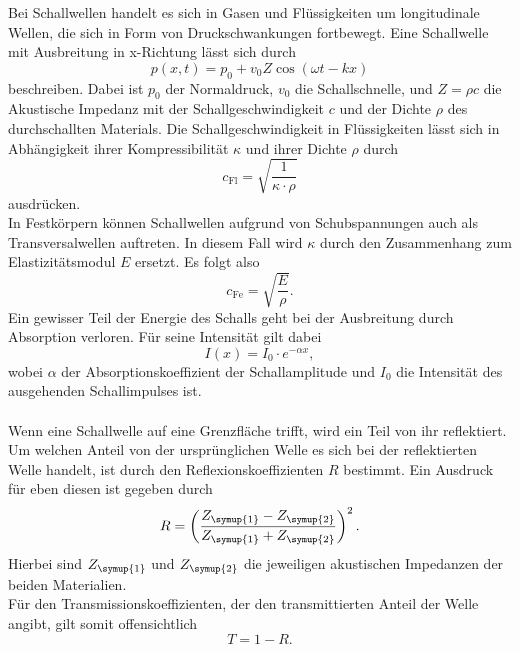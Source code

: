 \label{sec:Schallwellen}
Bei Schallwellen handelt es sich in Gasen und Flüssigkeiten um longitudinale Wellen, die sich in Form von Druckschwankungen fortbewegt.
Eine Schallwelle mit Ausbreitung in x-Richtung lässt sich durch
\begin{equation}
    p(x, t) = p_0 + v_0 Z \cos{(\omega t - kx)}
\end{equation}
beschreiben. Dabei ist $p_0$ der Normaldruck, $v_0$ die Schallschnelle, und $Z=\rho c$ die Akustische
Impedanz mit der Schallgeschwindigkeit $c$ und der Dichte $\rho$ des durchschallten Materials.
Die Schallgeschwindigkeit in Flüssigkeiten lässt sich in Abhängigkeit ihrer Kompressibilität $\kappa$ und ihrer
Dichte $\rho$ durch
\begin{equation}
    c_{\mathrm{Fl}} = \sqrt{\frac{1}{\kappa \cdot \rho}}
\end{equation}
ausdrücken. \\
In Festkörpern können Schallwellen aufgrund von Schubspannungen auch als Transversalwellen auftreten. In diesem Fall wird 
$\kappa$ durch den Zusammenhang zum Elastizitätsmodul $E$ ersetzt. Es folgt also
\begin{equation}
    c_{\mathrm{Fe}} = \sqrt{\frac{E}{\rho}}.
\end{equation}
Ein gewisser Teil der Energie des Schalls geht bei der Ausbreitung durch Absorption verloren. Für seine Intensität gilt dabei
\begin{equation}
    \label{eqn:Dämpfung}
    I(x) = I_0 \cdot e^{-\alpha x},
\end{equation}
wobei $\alpha$ der Absorptionskoeffizient der Schallamplitude und $I_0$ die Intensität des ausgehenden 
Schallimpulses ist.\\
\\
Wenn eine Schallwelle auf eine Grenzfläche trifft, wird ein Teil von ihr reflektiert. Um welchen Anteil von der ursprünglichen Welle es sich bei der
reflektierten Welle handelt, ist durch den Reflexionskoeffizienten $R$ bestimmt. Ein Ausdruck für eben diesen ist gegeben durch
\begin{equation}
    R = \left(\frac{Z_{\symup{1}}- Z_{\symup{2}}}{Z_{\symup{1}}+Z_{\symup{2}}}\right)^2.
\end{equation}
Hierbei sind $Z_{\symup{1}}$ und $Z_{\symup{2}}$ die jeweiligen akustischen Impedanzen der beiden Materialien. \\
Für den Transmissionskoeffizienten, der den transmittierten Anteil der Welle angibt, gilt somit offensichtlich
\begin{equation}
    T = 1 - R.
\end{equation}


